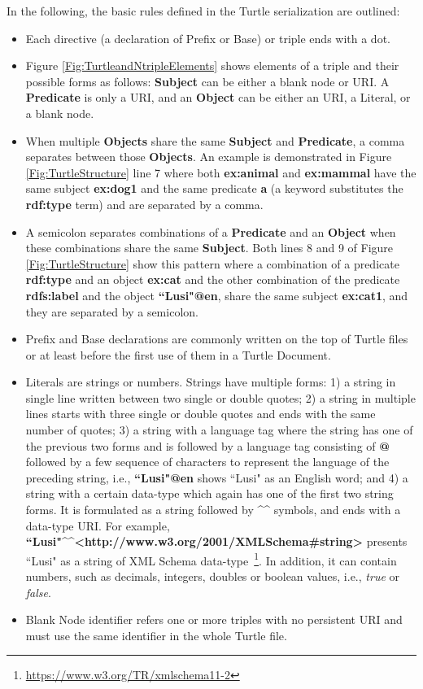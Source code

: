 In the following, the basic rules defined in the Turtle serialization are outlined:
\vspace{-3mm}
\begin{itemize}
    \item Each directive (a declaration of Prefix or Base) or triple ends with a dot.
    \item Figure \ref{Fig:TurtleandNtripleElements} shows elements of a triple and their possible forms as follows: \textbf{Subject} can be either a blank node or URI. A \textbf{Predicate} is only a URI, and an \textbf{Object} can be either an URI, a Literal, or a blank node.
    \item When multiple \textbf{Objects} share the same \textbf{Subject} and \textbf{Predicate}, a comma separates between those \textbf{Objects}.
    An example is demonstrated in Figure \ref{Fig:TurtleStructure} line 7 where both \textbf{ex:animal} and \textbf{ex:mammal} have the same subject \textbf{ex:dog1} and the same predicate \textbf{a} (a keyword substitutes the \textbf{rdf:type} term) and are separated by a comma.
    
     \item A semicolon separates combinations of a \textbf{Predicate} and an \textbf{Object} when these combinations share the same \textbf{Subject}. 
     Both lines 8 and 9 of Figure \ref{Fig:TurtleStructure} show this pattern where a combination of a predicate \textbf{rdf:type} and an object \textbf{ex:cat} and the other combination of the predicate \textbf{rdfs:label} and the object \textbf{``Lusi"@en}, share the same subject \textbf{ex:cat1}, and they are separated by a semicolon.
     
      \item Prefix and Base declarations are commonly written on the top of Turtle files or at least before the first use of them in a Turtle Document.
      
     \item Literals are strings or numbers. 
     Strings have multiple forms: 1) a string in single line written between two single or double quotes; 2) a string in multiple lines starts with three single or double quotes and ends with the same number of quotes; 3) a string with a language tag where the string has one of the previous two forms and is followed by a language tag consisting of \textbf{@} followed by a few sequence of characters to represent the language of the preceding string, i.e., \textbf{``Lusi"@en} shows ``Lusi" as an English word; and 4) a string with a certain data-type which again has one of the first two string forms. It is formulated as a string followed by  \textbf{\textasciicircum\textasciicircum} symbols, and ends with a data-type URI.  For example,  \textbf{``Lusi"\textasciicircum\textasciicircum\textless http://www.w3.org/2001/XMLSchema\#string\textgreater} presents ``Lusi" as  a string of XML Schema data-type~\footnote{\url{https://www.w3.org/TR/xmlschema11-2}}.
     In addition, it can contain numbers, such as decimals, integers, doubles or boolean values, i.e., \emph{true} or \emph{false}.
     \item Blank Node identifier refers one or more triples with no persistent URI and must use the same identifier in the whole Turtle file.   
     

\end{itemize}
